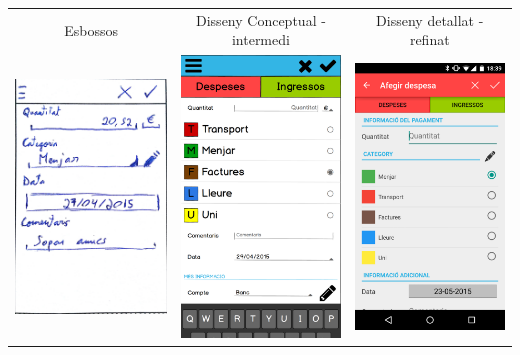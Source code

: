 \begin{table}
\begin{tabular}{| c | c | c |}
\hline
Esbossos & Disseny Conceptual - intermedi & Disseny detallat - refinat \\
\includegraphics[width=50mm]{1_Add_expense.jpg} &
\includegraphics[width=50mm]{2_Add_expense.png} &
\includegraphics[width=50mm]{3_Add_expense.png} \\
\hline
\end{tabular}
\end{table}


